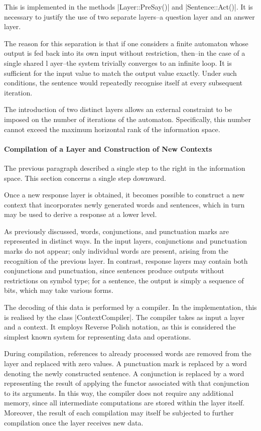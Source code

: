 \documentclass[12pt, a4paper]{article}
\begin{document}
This is implemented in the methods |Layer::PreSay()| and |Sentence::Act()|. It is necessary 
to justify the use of two separate layers--a question layer and an answer layer.

The reason for this separation is that if one considers a finite automaton whose output 
is fed back into its own input without restriction, then--in the case of a single shared l
ayer--the system trivially converges to an infinite loop. It is sufficient for the input 
value to match the output value exactly. Under such conditions, the sentence would 
repeatedly recognise itself at every subsequent iteration.

The introduction of two distinct layers allows an external constraint to be imposed on 
the number of iterations of the automaton. Specifically, this number cannot exceed 
the maximum horizontal rank of the information space.

 
\paragraph{Compilation of a Layer and Construction of New Contexts}

The previous paragraph described a single step to the right in the information space. 
This section concerns a single step downward.

Once a new response layer is obtained, it becomes possible to construct a new context 
that incorporates newly generated words and sentences, which in turn may be used to 
derive a response at a lower level.

As previously discussed, words, conjunctions, and punctuation marks are represented 
in distinct ways. In the input layers, conjunctions and punctuation marks do not appear; 
only individual words are present, arising from the recognition of the previous layer. 
In contrast, response layers may contain both conjunctions and punctuation, since 
sentences produce outputs without restrictions on symbol type; for a sentence, the output 
is simply a sequence of bits, which may take various forms.

The decoding of this data is performed by a compiler. In the implementation, this is 
realised by the class |ContextCompiler|. The compiler takes as input a layer and a 
context. It employs Reverse Polish notation\cite{Reverse_Polish_notation}, as this is 
considered the simplest known system for representing data and operations.

During compilation, references to already processed words are removed from the layer 
and replaced with zero values. A punctuation mark is replaced by a word denoting the 
newly constructed sentence. A conjunction is replaced by a word representing the result 
of applying the functor associated with that conjunction to its arguments. In this way, 
the compiler does not require any additional memory, since all intermediate computations 
are stored within the layer itself. Moreover, the result of each compilation may itself 
be subjected to further compilation once the layer receives new data.
\end{document}
